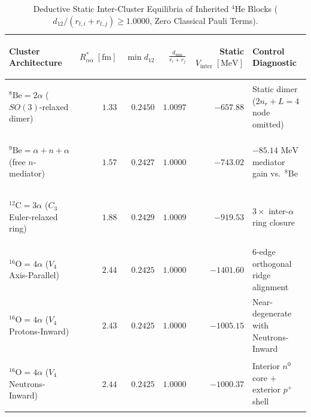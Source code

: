 \documentclass[11pt, a4paper]{article}
\DeclareRobustCommand{\dmin}{d_{\min}}
\begin{document}
\begin{table}[!htbp]
\centering
\caption{Deductive Static Inter-Cluster Equilibria of Inherited $^4\text{He}$ Blocks ($d_{12}/(r_{t,i}+r_{t,j}) \ge 1.0000$, Zero Classical Pauli Terms).}
\label{tab:alpha_macro}
\footnotesize
\setlength{\tabcolsep}{4pt}
\renewcommand{\arraystretch}{1.16}
\begin{tabularx}{\textwidth}{>{\bfseries\raggedright\arraybackslash}p{} r r r r >{\raggedright\arraybackslash}X}
\toprule
Cluster Architecture & $R_{\alpha\alpha}^*\;[\text{fm}]$ & $\min d_{12}$ & $\frac{\dmin}{r_i+r_j}$ & Static $V_{\mathrm{inter}}\;[\text{MeV}]$ & Control Diagnostic \\
\midrule
$^8\text{Be} = 2\alpha$ ($SO(3)$-relaxed dimer) & $1.33$ & $0.2450$ & $1.0097$ & $-657.88$ & Static dimer ($2n_r + L = 4$ node omitted) \\
$^9\text{Be} = \alpha + n + \alpha$ (free $n$-mediator) & $1.57$ & $0.2427$ & $1.0000$ & $\mathbf{-743.02}$ & $-85.14\text{ MeV}$ mediator gain vs.\ $^8\text{Be}$ \\
$^{12}\text{C} = 3\alpha$ ($C_3$ Euler-relaxed ring) & $1.88$ & $0.2429$ & $1.0009$ & $-919.53$ & $3\times$ inter-$\alpha$ ring closure \\
$^{16}\text{O} = 4\alpha$ ($V_4$ Axis-Parallel) & $2.44$ & $0.2425$ & $1.0000$ & $-1401.60$ & $6$-edge orthogonal ridge alignment \\
$^{16}\text{O} = 4\alpha$ ($V_4$ Protons-Inward) & $2.43$ & $0.2425$ & $1.0000$ & $-1005.15$ & Near-degenerate with Neutrons-Inward \\
$^{16}\text{O} = 4\alpha$ ($V_4$ Neutrons-Inward) & $2.44$ & $0.2425$ & $1.0000$ & $-1000.37$ & Interior $n^0$ core + exterior $p^+$ shell \\
\bottomrule
\end{tabularx}
\end{table}
\end{document}
